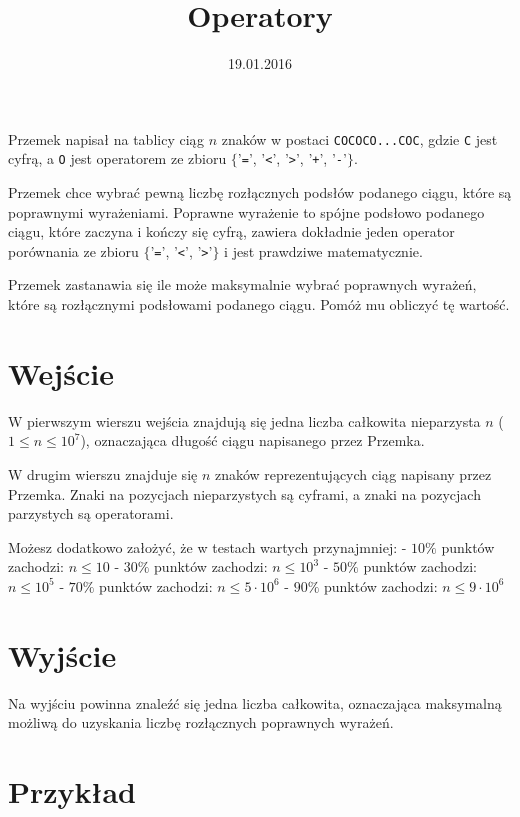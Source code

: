 \documentclass[zad,zawodnik,utf8]{sinol}
\title{Operatory}
\author{} %
\date{19.01.2016}
\begin{document}
\begin{tasktext}%
Przemek napisał na tablicy ciąg $n$ znaków w postaci \texttt{COCOCO...COC}, gdzie \texttt{C} jest cyfrą, a \texttt{O} jest operatorem ze zbioru $\{$'\texttt{=}', '\texttt{<}', '\texttt{>}', '\texttt{+}', '\texttt{-}'$\}$.

Przemek chce wybrać pewną liczbę rozłącznych podsłów podanego ciągu, które są poprawnymi wyrażeniami. Poprawne wyrażenie to spójne podsłowo podanego ciągu, które zaczyna i kończy się cyfrą, zawiera dokładnie jeden operator porównania ze zbioru $\{$'\texttt{=}', '\texttt{<}', '\texttt{>}'$\}$ i jest prawdziwe matematycznie.

Przemek zastanawia się ile może maksymalnie wybrać poprawnych wyrażeń, które są rozłącznymi podsłowami podanego ciągu. Pomóż mu obliczyć tę wartość.

  \section{Wejście}
W pierwszym wierszu wejścia znajdują się jedna liczba całkowita nieparzysta $n$ ($1 \leq n \leq 10^7$), oznaczająca długość ciągu napisanego przez Przemka.

W drugim wierszu znajduje się $n$ znaków reprezentujących ciąg napisany przez Przemka. Znaki na pozycjach nieparzystych są cyframi, a znaki na pozycjach parzystych są operatorami.

Możesz dodatkowo założyć, że w testach wartych przynajmniej:\newline
- $10\%$ punktów zachodzi: $n \leq 10$\newline
- $30\%$ punktów zachodzi: $n \leq 10^3$\newline
- $50\%$ punktów zachodzi: $n \leq 10^5$\newline
- $70\%$ punktów zachodzi: $n \leq 5 \cdot 10^6$\newline
- $90\%$ punktów zachodzi: $n \leq 9 \cdot 10^6$

  \section{Wyjście}
Na wyjściu powinna znaleźć się jedna liczba całkowita, oznaczająca maksymalną możliwą do uzyskania liczbę rozłącznych poprawnych wyrażeń.

  \section{Przykład}


\end{tasktext}
\end{document}

